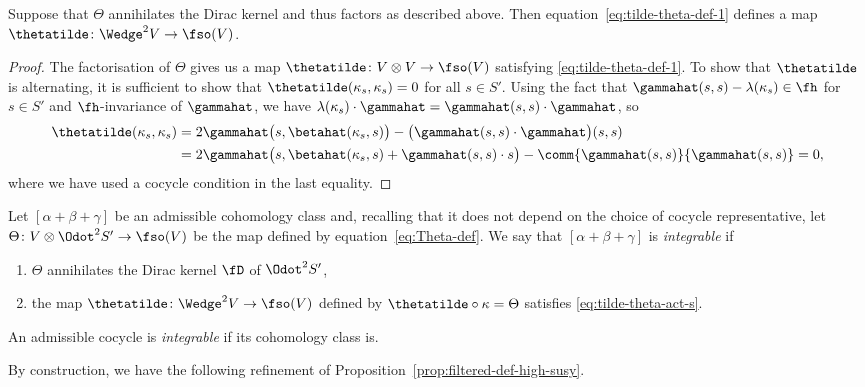 \begin{Lemma}\label{lemma:theta-well-def}
	Suppose that $\Theta$ annihilates the Dirac kernel and thus factors as described above. Then equation~\eqref{eq:tilde-theta-def-1} defines a map $\thetatilde\colon\Wedge^2V\to \fso(V)$.
\end{Lemma}

\begin{proof}
	The factorisation of $\Theta$ gives us a map $\thetatilde\colon V\otimes V \to \fso(V)$ satisfying \eqref{eq:tilde-theta-def-1}. To show that $\thetatilde$ is alternating, it is sufficient to show that $\thetatilde(\kappa_s,\kappa_s)=0$ for all $s\in S'$. Using the fact that $\gammahat(s,s)-\lambda(\kappa_s)\in\fh$ for $s\in S'$ and $\fh$-invariance of $\gammahat$, we have $\lambda(\kappa_s)\cdot\gammahat = \gammahat(s,s)\cdot\gammahat$, so
	\begin{align*}
		\thetatilde(\kappa_s,\kappa_s)
		&= 2\gammahat\bigl(s,\betahat(\kappa_s,s)\bigr) - \bigl(\gammahat(s,s)\cdot\gammahat\bigr)(s,s)\\
		& = 2\gammahat\bigl(s,\betahat(\kappa_s,s) + \gammahat(s,s)\cdot s\bigr) - \comm{\gammahat(s,s)}{\gammahat(s,s)}
		= 0,
	\end{align*}
	where we have used a cocycle condition in the last equality.
\end{proof}

\begin{Definition}\label{def:integrable-cocycle}
	Let $[\alpha+\beta+\gamma]$ be an admissible cohomology class and, recalling that it does not depend on the choice of cocycle representative, let $\Theta\colon V\otimes\Odot^2S'\to\fso(V) $ be the map defined by equation~\eqref{eq:Theta-def}. We say that $[\alpha+\beta+\gamma]$ is \emph{integrable} if
	\begin{enumerate}\itemsep=0pt
	\item $\Theta$ annihilates the Dirac kernel $\fD$ of $\Odot^2S'$,
	\item the map $\thetatilde\colon\Wedge^2 V\to \fso(V)$ defined by $\thetatilde\circ\kappa=\Theta$ satisfies	\eqref{eq:tilde-theta-act-s}.
	\end{enumerate}
	An admissible cocycle is \emph{integrable} if its cohomology class is.
\end{Definition}

By construction, we have the following refinement of Proposition~\ref{prop:filtered-def-high-susy}.

